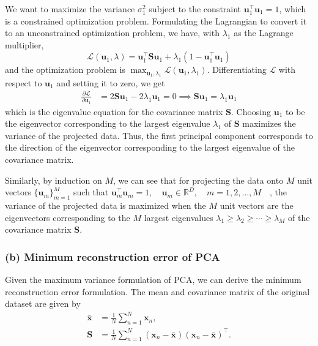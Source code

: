 We want to maximize the variance \( \sigma_1^2 \) subject to the constraint \( \mathbf{u}_1^\top \mathbf{u}_1 = 1 \), which is a constrained optimization problem.
Formulating the Lagrangian to convert it to an unconstrained optimization problem, we have, with \( \lambda_1 \) as the Lagrange multiplier,
\begin{equation*}
    \mathcal{L}(\mathbf{u}_1, \lambda)
    =
    \mathbf{u}_1^\top \mathbf{S} \mathbf{u}_1 + \lambda_1 (1 - \mathbf{u}_1^\top \mathbf{u}_1)
\end{equation*}
and the optimization problem is \( \max_{\mathbf{u}_1, \lambda_1} \mathcal{L}(\mathbf{u}_1, \lambda_1) \).
Differentiating \( \mathcal{L} \) with respect to \( \mathbf{u}_1 \) and setting it to zero, we get
\begin{align*}
    \frac{\partial \mathcal{L}}{\partial \mathbf{u}_1}
     & =
    2 \mathbf{S} \mathbf{u}_1 - 2 \lambda_1 \mathbf{u}_1
    =
    0
    \implies
    \mathbf{S} \mathbf{u}_1 = \lambda_1 \mathbf{u}_1
\end{align*}
which is the eigenvalue equation for the covariance matrix \( \mathbf{S} \).
Choosing \( \mathbf{u}_1 \) to be the eigenvector corresponding to the largest eigenvalue \( \lambda_1 \) of \( \mathbf{S} \) maximizes the variance of the projected data.
Thus, the first principal component corresponds to the direction of the eigenvector corresponding to the largest eigenvalue of the covariance matrix.

Similarly, by induction on \( M \), we can see that for projecting the data onto \( M \) unit vectors \( {\{ \mathbf{u}_m \}}_{m=1}^{M} \) such that \( \mathbf{u}_m^\top \mathbf{u}_m = 1, \quad \mathbf{u}_m \in \mathbb{R}^D, \quad m = 1, 2, \dots, M \quad \), the variance of the projected data is maximized when the \( M \) unit vectors are the eigenvectors corresponding to the \( M \) largest eigenvalues \( \lambda_1 \geq \lambda_2 \geq \cdots \geq \lambda_M \) of the covariance matrix \( \mathbf{S} \).

\subsubsection*{(b) Minimum reconstruction error of PCA}

Given the maximum variance formulation of PCA, we can derive the minimum reconstruction error formulation.
The mean and covariance matrix of the original dataset are given by
\begin{align*}
    \bar{\mathbf{x}}
     & =
    \frac{1}{N} \sum_{n=1}^{N} \mathbf{x}_n,
    \\
    \mathbf{S}
     & =
    \frac{1}{N} \sum_{n=1}^{N} {(\mathbf{x}_n - \bar{\mathbf{x}})}{(\mathbf{x}_n - \bar{\mathbf{x}})^\top}.
\end{align*}


